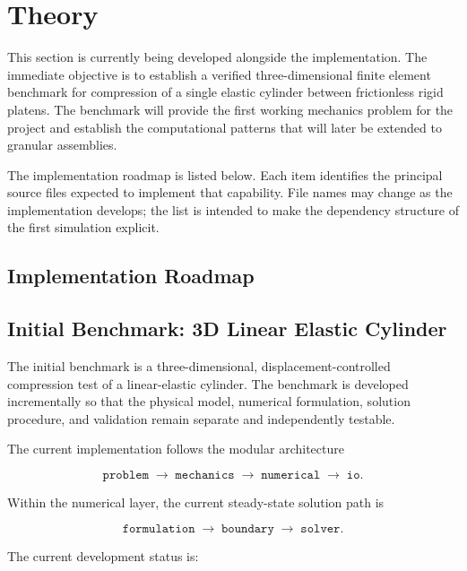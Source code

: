 \section{Theory}

This section is currently being developed alongside the implementation. The immediate objective is to establish a verified three-dimensional finite element benchmark for compression of a single elastic cylinder between frictionless rigid platens. The benchmark will provide the first working mechanics problem for the project and establish the computational patterns that will later be extended to granular assemblies.

The implementation roadmap is listed below. Each item identifies the principal source files expected to implement that capability. File names may change as the implementation develops; the list is intended to make the dependency structure of the first simulation explicit.

\subsection{Implementation Roadmap}

\subsection{Initial Benchmark: 3D Linear Elastic Cylinder}

The initial benchmark is a three-dimensional, displacement-controlled
compression test of a linear-elastic cylinder. The benchmark is developed
incrementally so that the physical model, numerical formulation, solution
procedure, and validation remain separate and independently testable.

The current implementation follows the modular architecture

$$
\texttt{problem}
\;\rightarrow\;
\texttt{mechanics}
\;\rightarrow\;
\texttt{numerical}
\;\rightarrow\;
\texttt{io}.
$$

Within the numerical layer, the current steady-state solution path is

$$
\texttt{formulation}
\;\rightarrow\;
\texttt{boundary}
\;\rightarrow\;
\texttt{solver}.
$$

The current development status is:

